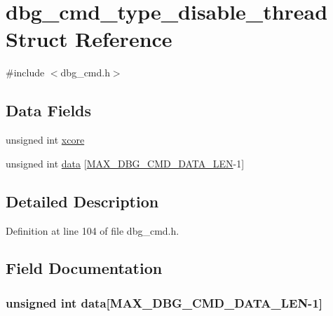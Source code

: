 \hypertarget{structdbg__cmd__type__disable__thread}{\section{dbg\-\_\-cmd\-\_\-type\-\_\-disable\-\_\-thread Struct Reference}
\label{structdbg__cmd__type__disable__thread}
}


{\ttfamily \#include $<$dbg\-\_\-cmd.\-h$>$}

\subsection*{Data Fields}
\begin{DoxyCompactItemize}
\item 
unsigned int \hyperlink{structdbg__cmd__type__disable__thread_a78357326dd562d441c3c73f5676ac638}{xcore}
\item 
unsigned int \hyperlink{structdbg__cmd__type__disable__thread_abceed6826af53b88f4cc936fac1716f0}{data} \mbox{[}\hyperlink{dbg__cmd_8h_a4552ec15033c8a68870cdf80eda5470c}{M\-A\-X\-\_\-\-D\-B\-G\-\_\-\-C\-M\-D\-\_\-\-D\-A\-T\-A\-\_\-\-L\-E\-N}-\/1\mbox{]}
\end{DoxyCompactItemize}


\subsection{Detailed Description}


Definition at line 104 of file dbg\-\_\-cmd.\-h.



\subsection{Field Documentation}
\hypertarget{structdbg__cmd__type__disable__thread_abceed6826af53b88f4cc936fac1716f0}{
\subsubsection[{data}]{\setlength{\rightskip}{0pt plus 5cm}unsigned int data\mbox{[}{\bf M\-A\-X\-\_\-\-D\-B\-G\-\_\-\-C\-M\-D\-\_\-\-D\-A\-T\-A\-\_\-\-L\-E\-N}-\/1\mbox{]}}}\label{structdbg__cmd__type__disable__thread_abceed6826af53b88f4cc936fac1716f0}



